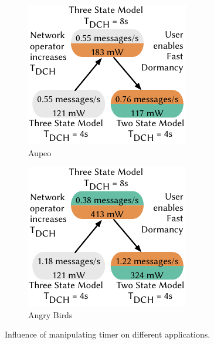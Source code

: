 \begin{figure}
	\begin{subfigure}[b]{.5\textwidth}
	\centering
	\includegraphics{network/network_traces/numerical_results/figures/consequences_aupeo}
	\caption{Aupeo}\label{fig:network:network_traces:numerical_results:consequences:aupeo}
	\end{subfigure}
	\begin{subfigure}[b]{.5\textwidth}
	\centering
	\includegraphics{network/network_traces/numerical_results/figures/consequences_angry_birds}
	\caption{Angry Birds}\label{fig:network:network_traces:numerical_results:consequences:angry_birds}
	\end{subfigure}
	\caption{Influence of manipulating \TDCH timer on different applications.}\label{fig:network:network_traces:numerical_results:consequences}
\end{figure}

